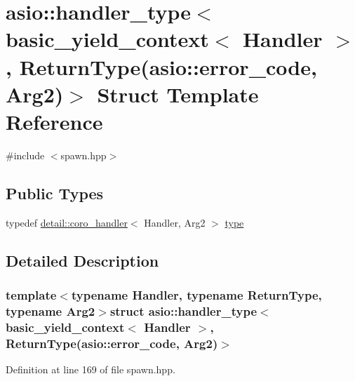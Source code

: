 \hypertarget{structasio_1_1handler__type_3_01basic__yield__context_3_01_handler_01_4_00_01_01_01_01_01_01_01_d15b502de1534464d7abfd193f1b4967}{}\section{asio\+:\+:handler\+\_\+type$<$ basic\+\_\+yield\+\_\+context$<$ Handler $>$, Return\+Type(asio\+:\+:error\+\_\+code, Arg2)$>$ Struct Template Reference}
\label{structasio_1_1handler__type_3_01basic__yield__context_3_01_handler_01_4_00_01_01_01_01_01_01_01_d15b502de1534464d7abfd193f1b4967}


{\ttfamily \#include $<$spawn.\+hpp$>$}

\subsection*{Public Types}
\begin{DoxyCompactItemize}
\item 
typedef \hyperlink{classasio_1_1detail_1_1coro__handler}{detail\+::coro\+\_\+handler}$<$ Handler, Arg2 $>$ \hyperlink{structasio_1_1handler__type_3_01basic__yield__context_3_01_handler_01_4_00_01_01_01_01_01_01_01_d15b502de1534464d7abfd193f1b4967_ac79206d3bc40e561474c164aa76250ec}{type}
\end{DoxyCompactItemize}


\subsection{Detailed Description}
\subsubsection*{template$<$typename Handler, typename Return\+Type, typename Arg2$>$struct asio\+::handler\+\_\+type$<$ basic\+\_\+yield\+\_\+context$<$ Handler $>$,           Return\+Type(asio\+::error\+\_\+code, Arg2)$>$}



Definition at line 169 of file spawn.\+hpp.



